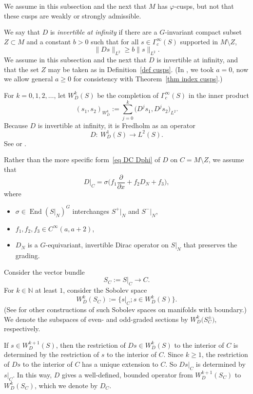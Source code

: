 \documentclass[10pt,a4paper]{amsart}
\numberwithin{equation}{section}
\DeclareMathOperator{\End}{End}
\newcommand{\N}{\mathbb{N}}
\begin{document}
 We assume in this subsection and the next that $M$ has $\varphi$-cusps, but not that these cusps are weakly or strongly admissible.

We say that $D$ is \emph{invertible at infinity} if there are a $G$-invariant compact subset $Z\subset M$ and a constant $b>0$ such that for all $s \in \Gamma^{\infty}_c(S)$ supported in $M \setminus Z$,
\begin{equation} \label{eq D inv infty}
\|Ds\|_{L^2} \geq b \|s\|_{L^2}.
\end{equation}
We assume in this subsection and the next that $D$ is {invertible at infinity}, and that the set $Z$ may be taken as in Definition~\ref{def cusps}. (In \cite{HW21a}, we took $a=0$, now we allow general $a \geq 0$ for consistency with Theorem~\ref{thm index cusps}.)

For $k=0, 1, 2, \dots$, let $W^k_D(S)$ be the completion of $\Gamma^{\infty}_c(S)$ in the inner product
\begin{equation*}
(s_1, s_2)_{W^k_D} := \sum_{j=0}^k \big(D^js_1, D^js_2\big)_{L^2}.
\end{equation*}
Because $D$ is invertible at infinity, it is Fredholm as an operator
\[
D\colon\ W^1_D(S) \to L^2(S).
\]
See \cite[Theorem 2.1]{Anghel93b} or \cite[Theorem 3.2]{Gromov83}.


Rather than the more specific form~\eqref{eq DC Dphi} of $D$ on $C = M \setminus Z$, we assume that
\begin{equation} \label{eq D on U}
D|_C = \sigma \bigg(f_1 \frac{\partial}{\partial x} + f_2 D_N + f_3 \bigg),
\end{equation}
where
\begin{itemize}\itemsep=0pt
\item $\sigma \in \End(S|_N)^G$ interchanges $S^+|_N$ and $S^-|_N$,
\item $f_1, f_2, f_3 \in C^{\infty}(a,a+2)$,
\item $D_N$ is a $G$-equivariant, invertible Dirac operator on $S|_N$ that preserves the grading.
\end{itemize}

Consider the vector bundle
\[
S_C := S|_{C} \to C.
\]
For $k \in \N$ at least $1$, consider the Sobolev space
\[
W^k_D(S_C) := \big\{s|_C; s \in W^k_D(S)\big\}.
\]
(See \cite{BB12} for other constructions of such Sobolev spaces on manifolds with boundary.)
We denote the subspaces of even- and odd-graded sections by $W^k_D\big(S_C^{\pm}\big)$, respectively.

If $s \in W^{k+1}_D(S)$, then the restriction of $Ds \in W^k_D(S)$ to the interior of $C$ is determined by the restriction of $s$ to the interior of $C$. Since $k \geq 1$, the restriction of $Ds$ to the interior of $C$ has a unique extension to $C$. So $Ds|_C$ is determined by $s|_C$. In this way, $D$ gives a well-defined, bounded operator from $W^{k+1}_D(S_C)$ to $W^k_D(S_C)$, which we denote by
 $D_C$.
\end{document}
